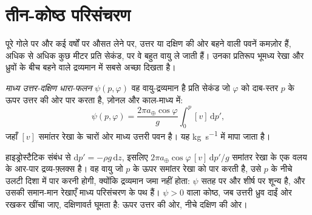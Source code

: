 \section{तीन-कोष्ठ परिसंचरण}\label{sec:b1:atmospheric-circulation:cells}

पूरे गोले पर और कई वर्षों पर औसत लेने पर, उत्तर या दक्षिण की ओर बहने वाली पवनें कमज़ोर हैं, अधिक से अधिक कुछ मीटर प्रति सेकंड, पर वे बहुत वायु ले जाती हैं। उनका प्रतिरूप भूमध्य रेखा और ध्रुवों के बीच बहने वाले द्रव्यमान में सबसे अच्छा दिखता है।

\begin{definition}[माध्य उत्तर-दक्षिण धारा-फलन]\label{def:b1:atmospheric-circulation:streamfunction}
\emph{माध्य उत्तर-दक्षिण धारा-फलन}
$\psi(p, \varphi)$ वह वायु-द्रव्यमान है प्रति सेकंड जो  $\varphi$ को दाब-स्तर $p$ के ऊपर उत्तर की ओर पार करता है, ज़ोनल और काल-माध्य में:
\[
  \psi(p, \varphi) = \frac{2\pi a_\oplus\cos\varphi}{g}\int_0^p [v]\,\mathrm dp' ,
\]
जहाँ $[v]$ समांतर रेखा के चारों ओर माध्य उत्तरी पवन है। यह \unit{kg.s^{-1}} में मापा जाता है।
\end{definition}

हाइड्रोस्टैटिक संबंध से $\mathrm dp' = -\rho g\,\mathrm dz$, इसलिए $2\pi a_\oplus
\cos\varphi\,[v]\,\mathrm dp'/g$ समांतर रेखा के एक वलय के आर-पार द्रव्य-फ़्लक्स है। वह वायु जो $p$ के ऊपर समांतर रेखा को पार करती है, उसे $p$ के नीचे उलटी दिशा में पार करनी होगी, क्योंकि द्रव्यमान जमा नहीं होता: $\psi$ सतह पर और शीर्ष पर शून्य है, और उसकी समान-मान रेखाएँ माध्य परिसंचरण के पथ हैं। $\psi > 0$ वाला कोष्ठ, जब उत्तरी ध्रुव दाईं ओर रखकर खींचा जाए, दक्षिणावर्त घूमता है: ऊपर उत्तर की ओर, नीचे दक्षिण की ओर।

